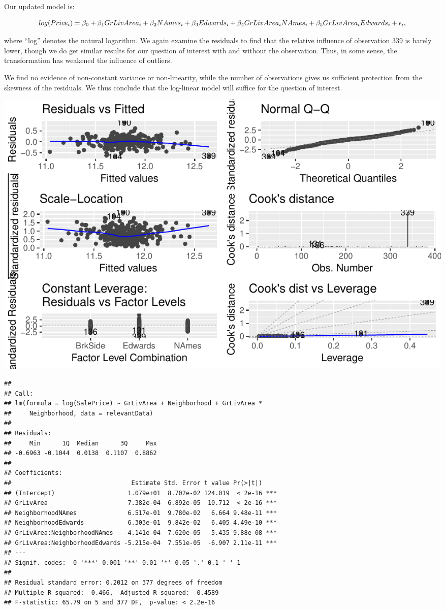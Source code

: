 \documentclass[american,]{article}
\begin{document}
Our updated model is:

\begin{equation}
log({Price_i}) = {\beta_0} + {\beta_1}GrLivArea_{i} + {\beta_2}NAmes_{i} + {\beta_3}Edwards_{i} + {\beta_4}GrLivArea_{i}\*NAmes_{i}
+ {\beta_5}GrLivArea_{i}\*Edwards_{i}
+ {\epsilon_i},
\end{equation}

where ``log'' denotes the natural logarithm. We again examine the
residuals to find that the relative influence of observation 339 is
barely lower, though we do get similar results for our question of
interest with and without the observation. Thus, in some sense, the
transformation has weakened the influence of outliers.

We find no evidence of non-constant variance or non-linearity, while the
number of observations gives us sufficient protection from the skewness
of the residuals. We thus conclude that the log-linear model will
suffice for the question of interest.

\includegraphics{HousePricesPaper_files/figure-latex/logmodelplot-1.pdf}

\begin{verbatim}
## 
## Call:
## lm(formula = log(SalePrice) ~ GrLivArea + Neighborhood + GrLivArea * 
##     Neighborhood, data = relevantData)
## 
## Residuals:
##     Min      1Q  Median      3Q     Max 
## -0.6963 -0.1044  0.0138  0.1107  0.8862 
## 
## Coefficients:
##                                 Estimate Std. Error t value Pr(>|t|)    
## (Intercept)                    1.079e+01  8.702e-02 124.019  < 2e-16 ***
## GrLivArea                      7.382e-04  6.892e-05  10.712  < 2e-16 ***
## NeighborhoodNAmes              6.517e-01  9.780e-02   6.664 9.48e-11 ***
## NeighborhoodEdwards            6.303e-01  9.842e-02   6.405 4.49e-10 ***
## GrLivArea:NeighborhoodNAmes   -4.141e-04  7.620e-05  -5.435 9.88e-08 ***
## GrLivArea:NeighborhoodEdwards -5.215e-04  7.551e-05  -6.907 2.11e-11 ***
## ---
## Signif. codes:  0 '***' 0.001 '**' 0.01 '*' 0.05 '.' 0.1 ' ' 1
## 
## Residual standard error: 0.2012 on 377 degrees of freedom
## Multiple R-squared:  0.466,  Adjusted R-squared:  0.4589 
## F-statistic: 65.79 on 5 and 377 DF,  p-value: < 2.2e-16
\end{verbatim}
\end{document}
